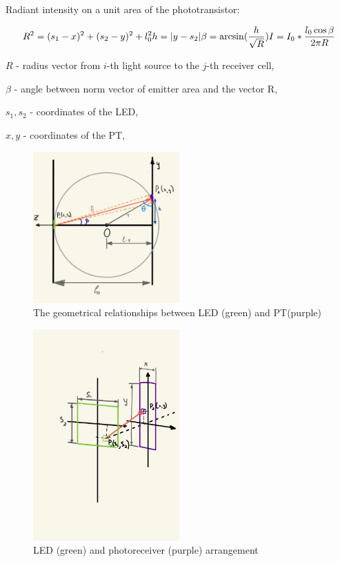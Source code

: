 Radiant intensity on a unit area of the phototransistor:

\[R^2 = (s_1- x)^2 + (s_2 - y)^2 + l_0 ^2\\

h = |y - s_2|\\

\beta = \arcsin(\frac{h}{\sqrt{R}})\\

I = I_0 * \frac{l_0 \cos{\beta}}{2 \pi R}\]

$R$ - radius vector from $i$-th light source to the $j$-th receiver cell,

$\beta$ - angle between norm vector of emitter area and the vector R,

$s_1, s_2$ - coordinates of the LED,

$x, y$ - coordinates of the PT,


\begin{figure}[H]
    \includegraphics[width=0.5\textwidth]{figs/simplified_model_notebook.jpg}
      \centering
      \caption{The geometrical relationships between LED (green) and PT(purple)}
      \label{fig:simplified_model_notebook}
    \end{figure}
    
\begin{figure}[H]
    \includegraphics[width=0.5\textwidth]{figs/arrangement_of_LED_PT.jpg}
        \centering
        \caption{LED (green) and photoreceiver (purple) arrangement} 
        \label{fig:arrangement_of_LED_PT}
    \end{figure}
    
